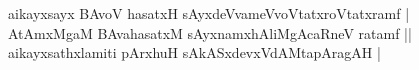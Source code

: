 \begin{entry}
\smallskip
\begin{shl}
aikayxsayx BAvoV hasatxH sAyxdeVvameVvoVtatxroVtatxramf |\\[1pt]
AtAmxMgaM BAvahasatxM sAyxnamxhAliMgAcaRneV ratamf ||\\[4pt]
aikayxsathxlamiti pArxhuH sAkASxdevxVdAMtapAragAH |
\end{shl}
\medskip
{}

\end{entry}

